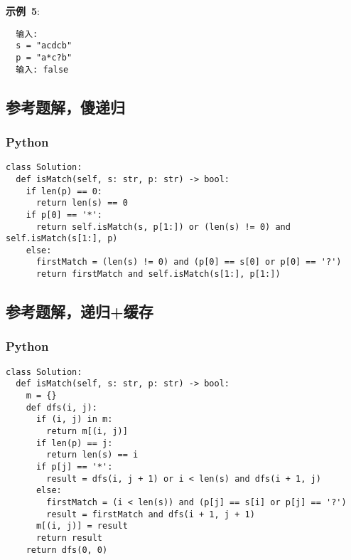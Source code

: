 \textbf{示例 5}:

\begin{verbatim}
  输入:
  s = "acdcb"
  p = "a*c?b"
  输入: false
\end{verbatim}

\subsection{参考题解，傻递归}

\subsubsection{Python}

\begin{verbatim}
class Solution:
  def isMatch(self, s: str, p: str) -> bool:
    if len(p) == 0:
      return len(s) == 0
    if p[0] == '*':
      return self.isMatch(s, p[1:]) or (len(s) != 0) and self.isMatch(s[1:], p)
    else:
      firstMatch = (len(s) != 0) and (p[0] == s[0] or p[0] == '?')
      return firstMatch and self.isMatch(s[1:], p[1:])
\end{verbatim}

\subsection{参考题解，递归+缓存}

\subsubsection{Python}

\begin{verbatim}
class Solution:
  def isMatch(self, s: str, p: str) -> bool:
    m = {}
    def dfs(i, j):
      if (i, j) in m:
        return m[(i, j)]
      if len(p) == j:
        return len(s) == i
      if p[j] == '*':
        result = dfs(i, j + 1) or i < len(s) and dfs(i + 1, j)
      else:
        firstMatch = (i < len(s)) and (p[j] == s[i] or p[j] == '?')
        result = firstMatch and dfs(i + 1, j + 1)
      m[(i, j)] = result
      return result
    return dfs(0, 0)
\end{verbatim}
